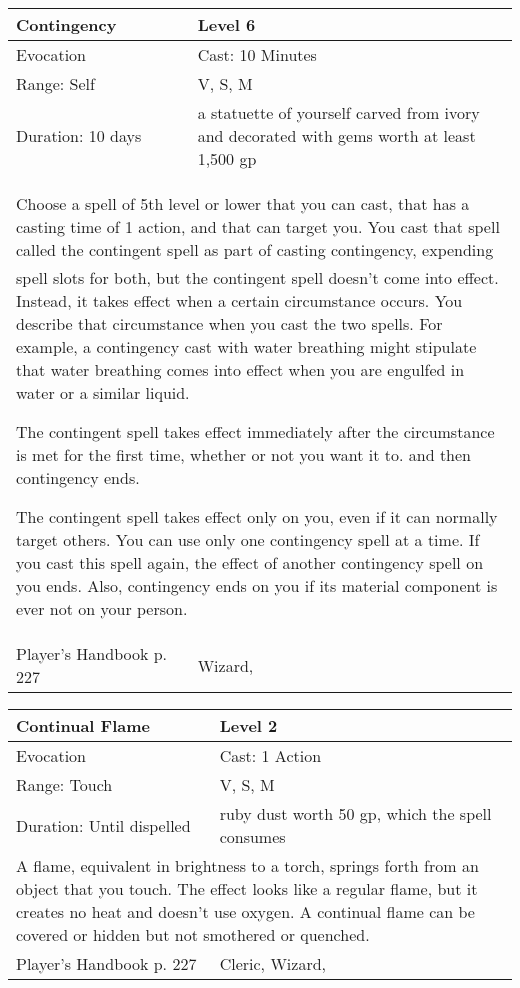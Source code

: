 \documentclass[11pt]{report}
\begin{document}
\begin{table}[H]
	\begin{tabular}{||p{6cm}|p{6cm}||}
		\hline\hline
		\bf{Contingency} & Level 6\\ \hline
		Evocation & Cast: 10 Minutes\\ \hline
		Range: Self & V, S, M \\ \hline
		Duration: 10 days & a statuette of yourself carved from ivory and decorated with gems worth at least 1,500 gp\\ \hline
		\multicolumn{2}{||p{12cm}||}{Choose a spell of 5th level or lower that you can cast, that has a casting time of 1 action, and that can target you. 
You cast that spell called the contingent spell as part of casting contingency, expending spell slots for both, but the contingent spell doesn’t come into effect. Instead, it takes effect when a certain circumstance occurs. You describe that circumstance when you cast the two spells. For example, a contingency cast with water breathing might stipulate that water breathing comes into effect when you are engulfed in water or a similar liquid. 

The contingent spell takes effect immediately after the circumstance is met for the first time, whether or not you want it to. and then contingency ends. 

The contingent spell takes effect only on you, even if it can normally target others. You can use only one contingency spell at a time. If you cast this spell again, the effect of another contingency spell on you ends. Also, contingency ends on you if its material component is ever not on your person.}\\ \hline
Player's Handbook p. 227 & Wizard, \\ \hline\hline
	\end{tabular}
\end{table}

\begin{table}[H]
	\begin{tabular}{||p{6cm}|p{6cm}||}
		\hline\hline
		\bf{Continual Flame} & Level 2\\ \hline
		Evocation & Cast: 1 Action\\ \hline
		Range: Touch & V, S, M \\ \hline
		Duration: Until dispelled & ruby dust worth 50 gp, which the spell consumes\\ \hline
		\multicolumn{2}{||p{12cm}||}{A flame, equivalent in brightness to a torch, springs forth from an object that you touch. 
The effect looks like a regular flame, but it creates no heat and doesn’t use oxygen. A continual flame can be covered or hidden but not smothered or quenched.}\\ \hline
Player's Handbook p. 227 & Cleric, Wizard, \\ \hline\hline
	\end{tabular}
\end{table}
\end{document}
